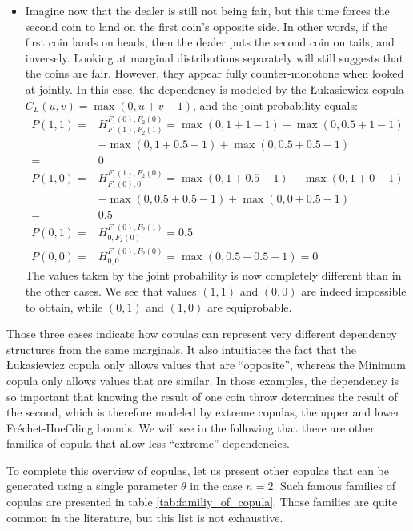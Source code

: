 \begin{example}
\begin{itemize}
		\item Imagine now that the dealer is still not being fair, but this time forces the second coin to land on the first coin's opposite side. In other words, if the first coin lands on heads, then the dealer puts the second coin on tails, and inversely. Looking at marginal distributions separately will still suggests that the coins are fair. However, they appear fully counter-monotone when looked at jointly. In this case, the dependency is modeled by the \L ukasiewicz copula $C_L(u,v)=\max(0,u+v-1)$, and the joint probability equals:
		\begin{align*}
            P(1,1) =& H_{F_1(1), F_2(1)}^{F_1(0), F_2(0)} = \max(0, 1+1-1) - \max(0, 0.5+1-1)\\
            &- \max(0, 1+0.5-1) + \max(0, 0.5+0.5-1)\\
            =& 0\\
            P(1,0) =& H_{F_1(0), 0}^{F_1(1), F_2(0)} =\max(0, 1+0.5-1) - \max(0, 1+0-1)\\
            &- \max(0, 0.5+0.5-1) + \max(0, 0+0.5-1)\\
            =& 0.5\\
            P(0,1) =& H_{0, F_2(0)}^{F_1(0), F_2(1)} = 0.5 \\
            P(0,0) =& H_{0, 0}^{F_1(0), F_2(0)} = \max(0, 0.5+0.5-1)=0
        \end{align*}
        The values taken by the joint probability is now completely different than in the other cases. We see that values $(1,1)$ and $(0,0)$ are indeed impossible to obtain, while $(0,1)$ and $(1,0)$ are equiprobable.
	\end{itemize}
	Those three cases indicate how copulas can represent very different dependency structures from the same marginals. It also intuitiates the fact that the \L ukasiewicz copula only allows values that are ``opposite'', whereas the Minimum copula only allows values that are similar. In those examples, the dependency is so important that knowing the result of one coin throw determines the result of the second, which is therefore modeled by extreme copulas, \ie the upper and lower Fréchet-Hoeffding bounds.  We will see in the following that there are other families of copula that allow less ``extreme'' dependencies.
\end{example}

To complete this overview of copulas, let us present other copulas that can be generated using a single parameter $\theta$ in the case $n=2$. Such famous families of copulas are presented in table \ref{tab:familiy_of_copula}. Those families are quite common in the literature, but this list is not exhaustive.

